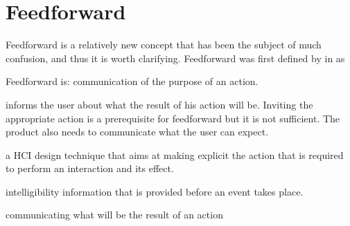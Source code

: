 \documentclass[a4paper]{article}
\begin{document}
\section{Feedforward} \label{section_background}
Feedforward is a relatively new concept that has been the subject of much confusion, and thus it is worth clarifying. Feedforward was first defined by \citeauthor{djajadiningrat2002but} in \citeyear{djajadiningrat2002but} as 


Feedforward is:
	communication of the purpose of an action. \cite{djajadiningrat2002but}

	informs the user about what the result of his action will be. Inviting the appropriate action is a prerequisite for feedforward but it is not sufficient. The product also needs to communicate what the user can expect. \cite{djajadiningrat2002but}

	a HCI design technique that aims at making explicit the action that is required to perform an interaction and its effect. \cite{chueke2016perceptible}
	
	intelligibility information that is provided before an event takes place. \cite{vermeulen2013intelligibility}
	
	communicating what will be the result of an action
\end{document}
